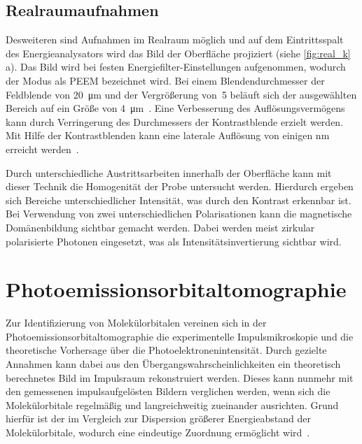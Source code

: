         \subsection{Realraumaufnahmen}
            Desweiteren sind Aufnahmen im Realraum möglich und auf dem Eintrittsspalt des Energieanalysators wird das Bild der Oberfläche projiziert (siehe \autoref{fig:real_k}\,a).
            Das Bild wird bei festen Energiefilter-Einstellungen aufgenommen, wodurch der Modus als PEEM bezeichnet wird.
            Bei einem Blendendurchmesser der Feldblende von \SI{20}{\micro\meter} und der Vergrößerung von~\num{5} beläuft sich der ausgewählten Bereich auf ein Größe von \SI{4}{\micro\meter}~\cite{SPECS-MM}.
            Eine Verbesserung des Auflösungsvermögens kann durch Verringerung des Durchmessers der Kontrastblende erzielt werden.
            Mit Hilfe der Kontrastblenden kann eine laterale Auflösung von einigen \si{\nano\meter} erreicht werden~\cite{locatelli_chemical_2015}. 

            Durch unterschiedliche Austrittsarbeiten innerhalb der Oberfläche kann mit dieser Technik die Homogenität der Probe untersucht werden.
            Hierdurch ergeben sich Bereiche unterschiedlicher Intensität, was durch den Kontrast erkennbar ist.
            Bei Verwendung von zwei unterschiedlichen Polarisationen kann die magnetische Domänenbildung sichtbar gemacht werden.
            Dabei werden meist zirkular polarisierte Photonen eingesetzt, was als Intensitätsinvertierung sichtbar wird.
        
    \section{Photoemissionsorbitaltomographie} \label{sec:MOT}
        Zur Identifizierung von Molekülorbitalen vereinen sich in der Photoemissionsorbitaltomographie die experimentelle Impulsmikroskopie und die theoretische Vorhersage über die Photoelektronenintensität.
        Durch gezielte Annahmen kann dabei aus den Übergangswahrscheinlichkeiten ein theoretisch berechnetes Bild im Impulsraum rekonstruiert werden.
        Dieses kann nunmehr mit den gemessenen impulsaufgelösten Bildern verglichen werden, wenn sich die Molekülorbitale regelmäßig und langreichweitig zueinander ausrichten.
        Grund hierfür ist der im Vergleich zur Dispersion größerer Energieabstand der Molekülorbitale, wodurch eine eindeutige Zuordnung ermöglicht wird~\cite{puschnig_reconstruction_2009}.

